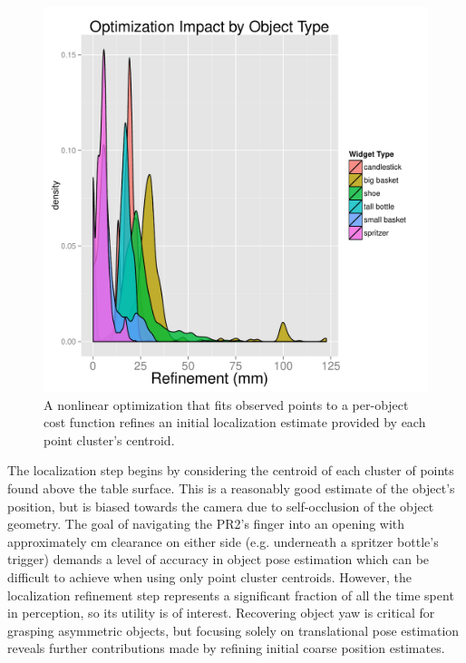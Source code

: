 \documentclass[letterpaper, 10 pt, conference]{ieeeconf}  %
\begin{document}
\begin{figure}[t]
\centering
\includegraphics[width=\columnwidth]{figures/refinement.pdf}
\caption{
A nonlinear optimization that fits observed points to a per-object
cost function refines an initial localization estimate provided by
each point cluster's centroid.
}
\label{fig:refinement}
\end{figure}

The localization step begins by considering the centroid of each
cluster of points found above the table surface. This is a reasonably
good estimate of the object's position, but is biased towards the
camera due to self-occlusion of the object geometry. The goal of
navigating the PR2's finger into an opening with approximately
\unit[1]{cm} clearance on either side (e.g. underneath a spritzer
bottle's trigger) demands a level of accuracy in object pose
estimation which can be difficult to achieve when using only point
cluster centroids. However, the localization refinement step
represents a significant fraction of all the time spent in perception,
so its utility is of interest. Recovering object yaw is critical for
grasping asymmetric objects, but focusing solely on translational pose
estimation reveals further contributions made by refining initial
coarse position estimates.
\end{document}
